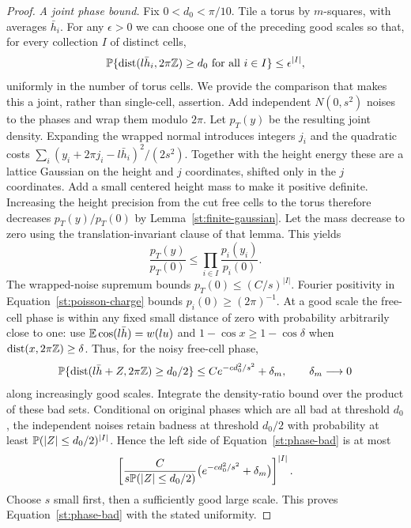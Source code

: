 \begin{proof}
\emph{A joint phase bound.}
Fix $0<d_0<\pi/10$. Tile a torus by $m$-squares, with averages $\bar h_i$.
For any $\epsilon>0$ we can choose one of the preceding good scales so
that, for every collection $I$ of distinct cells,
\begin{equation}\label{st:phase-bad}
 \mathbb P\{\operatorname{dist}(l\bar h_i,2\pi\mathbb Z)\ge d_0\text{ for all }i\in I\}
 \le\epsilon^{|I|},
\end{equation}
uniformly in the number of torus cells. We provide the comparison that
makes this a joint, rather than single-cell, assertion.
Add independent $N(0,s^2)$ noises to the phases and wrap them modulo
$2\pi$. Let $p_T(y)$ be the resulting joint density. Expanding the wrapped
normal introduces integers $j_i$ and the quadratic costs
$\sum_i(y_i+2\pi j_i-l\bar h_i)^2/(2s^2)$.
Together with the height energy these are a lattice Gaussian on the
height and $j$ coordinates, shifted only in the $j$ coordinates. Add a
small centered height mass to make it positive definite.
Increasing the height precision from the cut free cells to the torus
therefore decreases $p_T(y)/p_T(0)$ by
Lemma~\ref{st:finite-gaussian}. Let the mass decrease to zero using the
translation-invariant clause of that lemma. This yields
\[
 \frac{p_T(y)}{p_T(0)}\le\prod_{i\in I}\frac{p_i(y_i)}{p_i(0)}.
\]
The wrapped-noise supremum bounds $p_T(0)\le(C/s)^{|I|}$.
Fourier positivity in Equation~\eqref{st:poisson-charge} bounds
$p_i(0)\ge(2\pi)^{-1}$. At a good scale the free-cell phase is within any
fixed small distance of zero with probability arbitrarily close to one:
use $\mathbb E\cos(l\bar h)=w(lu)$ and
$1-\cos x\ge1-\cos\delta$ when $\operatorname{dist}(x,2\pi\mathbb Z)\ge\delta$.
Thus, for the noisy free-cell phase,
\[
 \mathbb P\{\operatorname{dist}(l\bar h+Z,2\pi\mathbb Z)\ge d_0/2\}
       \le C e^{-c d_0^2/s^2}+\delta_m,
 \qquad \delta_m\longrightarrow0
\]
along increasingly good scales. Integrate the density-ratio bound over
the product of these bad sets. Conditional on original phases which are
all bad at threshold $d_0$, the independent noises retain badness at
threshold $d_0/2$ with probability at least
$\mathbb P(|Z|\le d_0/2)^{|I|}$. Hence the left side of
Equation~\eqref{st:phase-bad} is at most
\[
 \left[
 \frac{C}{s\mathbb P(|Z|\le d_0/2)}
       \bigl(e^{-c d_0^2/s^2}+\delta_m\bigr)
 \right]^{|I|}.
\]
Choose $s$ small first, then a sufficiently good large scale. This proves
Equation~\eqref{st:phase-bad} with the stated uniformity.


\end{proof}
